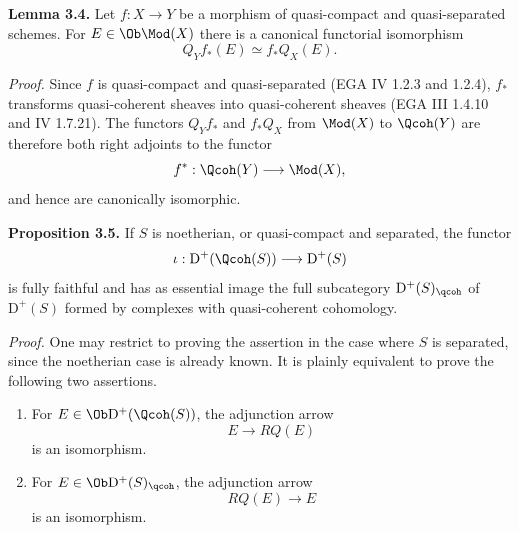 \textbf{Lemma 3.4.} Let $f:X\to Y$ be a morphism of quasi-compact and quasi-separated schemes. For $E\in\Ob\Mod(X)$ there is a canonical functorial isomorphism
\[
 Q_Y f_*(E)\simeq f_*Q_X(E).
\]

\emph{Proof.} Since $f$ is quasi-compact and quasi-separated (EGA IV 1.2.3 and 1.2.4), $f_*$ transforms quasi-coherent sheaves into quasi-coherent sheaves (EGA III 1.4.10 and IV 1.7.21). The functors $Q_Yf_*$ and $f_*Q_X$ from $\Mod(X)$ to $\Qcoh(Y)$ are therefore both right adjoints to the functor
\[
 f^*: \Qcoh(Y)\longrightarrow \Mod(X),
\]
and hence are canonically isomorphic.

\textbf{Proposition 3.5.} If $S$ is noetherian, or quasi-compact and separated, the functor
\[
 \iota:\mathrm D^+(\Qcoh(S))\longrightarrow \mathrm D^+(S)
\]
is fully faithful and has as essential image the full subcategory $\mathrm D^+(S)_{\qcoh}$ of $\mathrm D^+(S)$ formed by complexes with quasi-coherent cohomology.

\emph{Proof.} One may restrict to proving the assertion in the case where $S$ is separated, since the noetherian case is already known. It is plainly equivalent to prove the following two assertions.

\begin{enumerate}[label=(3.5.\arabic*)]
\item For $E\in\Ob\mathrm D^+(\Qcoh(S))$, the adjunction arrow
\[
 E\longrightarrow RQ(E)
\]
is an isomorphism.
\item For $E\in\Ob\mathrm D^+(S)_{\qcoh}$, the adjunction arrow
\[
 RQ(E)\longrightarrow E
\]
is an isomorphism.
\end{enumerate}

